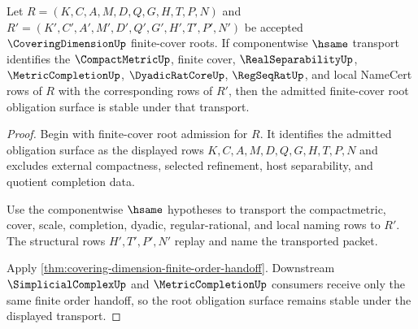 \begin{theorem}
\label{thm:covering-dimension-finite-cover-root-stability}
Let $R=(K,C,A,M,D,Q,G,H,T,P,N)$ and $R'=(K',C',A',M',D',Q',G',H',T',P',N')$ be accepted $\CoveringDimensionUp$ finite-cover roots. If componentwise $\hsame$ transport identifies the $\CompactMetricUp$, finite cover, $\RealSeparabilityUp$, $\MetricCompletionUp$, $\DyadicRatCoreUp$, $\RegSeqRatUp$, and local NameCert rows of $R$ with the corresponding rows of $R'$, then the admitted finite-cover root obligation surface is stable under that transport.
\end{theorem}
\begin{proof}
Begin with finite-cover root admission for $R$. It identifies the admitted obligation surface as the displayed rows $K,C,A,M,D,Q,G,H,T,P,N$ and excludes external compactness, selected refinement, host separability, and quotient completion data.

Use the componentwise $\hsame$ hypotheses to transport the compactmetric, cover, scale, completion, dyadic, regular-rational, and local naming rows to $R'$. The structural rows $H',T',P',N'$ replay and name the transported packet.

Apply \autoref{thm:covering-dimension-finite-order-handoff}. Downstream $\SimplicialComplexUp$ and $\MetricCompletionUp$ consumers receive only the same finite order handoff, so the root obligation surface remains stable under the displayed transport.
\end{proof}
